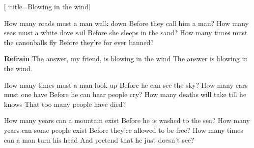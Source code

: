  [
ititle={Blowing in the wind}]

\beginverse
How many roads must a man walk down
Before they call him a man?
How many seas must a white dove sail
Before she sleeps in the sand?
How many times must the canonballs fly
Before they're for ever banned?
\endverse

\beginchorus
\textbf{Refrain}
The answer, my friend, is blowing in the wind
The answer is blowing in the wind.
\endchorus

\beginverse
How many times must a man look up
Before he can see the sky?
How many ears must one have
Before he can hear people cry?
How many deaths will take till he knows
That too many people have died?
\endverse

\beginverse
How many years can a mountain exist
Before he is washed to the sea?
How many years can some people exist
Before they're allowed to be free?
How many times can a man turn his head
And pretend that he just doesn't see?
\endverse
\endsong